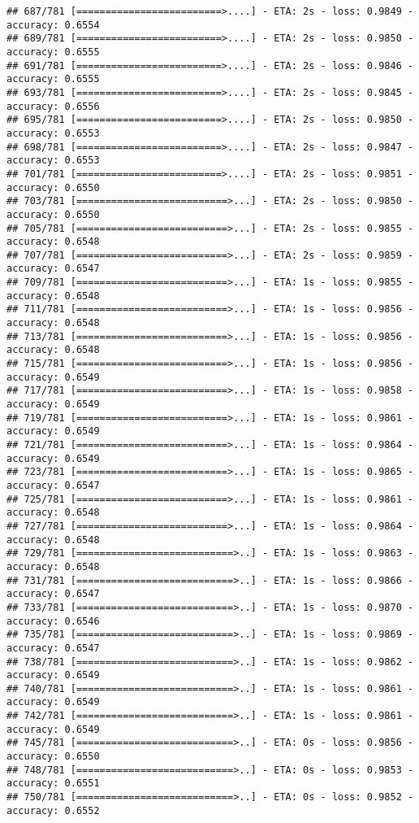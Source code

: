 \documentclass[
]{article}
\begin{document}
\begin{verbatim}
## 687/781 [=========================>....] - ETA: 2s - loss: 0.9849 - accuracy: 0.6554
## 689/781 [=========================>....] - ETA: 2s - loss: 0.9850 - accuracy: 0.6555
## 691/781 [=========================>....] - ETA: 2s - loss: 0.9846 - accuracy: 0.6555
## 693/781 [=========================>....] - ETA: 2s - loss: 0.9845 - accuracy: 0.6556
## 695/781 [=========================>....] - ETA: 2s - loss: 0.9850 - accuracy: 0.6553
## 698/781 [=========================>....] - ETA: 2s - loss: 0.9847 - accuracy: 0.6553
## 701/781 [=========================>....] - ETA: 2s - loss: 0.9851 - accuracy: 0.6550
## 703/781 [==========================>...] - ETA: 2s - loss: 0.9850 - accuracy: 0.6550
## 705/781 [==========================>...] - ETA: 2s - loss: 0.9855 - accuracy: 0.6548
## 707/781 [==========================>...] - ETA: 2s - loss: 0.9859 - accuracy: 0.6547
## 709/781 [==========================>...] - ETA: 1s - loss: 0.9855 - accuracy: 0.6548
## 711/781 [==========================>...] - ETA: 1s - loss: 0.9856 - accuracy: 0.6548
## 713/781 [==========================>...] - ETA: 1s - loss: 0.9856 - accuracy: 0.6548
## 715/781 [==========================>...] - ETA: 1s - loss: 0.9856 - accuracy: 0.6549
## 717/781 [==========================>...] - ETA: 1s - loss: 0.9858 - accuracy: 0.6549
## 719/781 [==========================>...] - ETA: 1s - loss: 0.9861 - accuracy: 0.6549
## 721/781 [==========================>...] - ETA: 1s - loss: 0.9864 - accuracy: 0.6549
## 723/781 [==========================>...] - ETA: 1s - loss: 0.9865 - accuracy: 0.6547
## 725/781 [==========================>...] - ETA: 1s - loss: 0.9861 - accuracy: 0.6548
## 727/781 [==========================>...] - ETA: 1s - loss: 0.9864 - accuracy: 0.6548
## 729/781 [===========================>..] - ETA: 1s - loss: 0.9863 - accuracy: 0.6548
## 731/781 [===========================>..] - ETA: 1s - loss: 0.9866 - accuracy: 0.6547
## 733/781 [===========================>..] - ETA: 1s - loss: 0.9870 - accuracy: 0.6546
## 735/781 [===========================>..] - ETA: 1s - loss: 0.9869 - accuracy: 0.6547
## 738/781 [===========================>..] - ETA: 1s - loss: 0.9862 - accuracy: 0.6549
## 740/781 [===========================>..] - ETA: 1s - loss: 0.9861 - accuracy: 0.6549
## 742/781 [===========================>..] - ETA: 1s - loss: 0.9861 - accuracy: 0.6549
## 745/781 [===========================>..] - ETA: 0s - loss: 0.9856 - accuracy: 0.6550
## 748/781 [===========================>..] - ETA: 0s - loss: 0.9853 - accuracy: 0.6551
## 750/781 [===========================>..] - ETA: 0s - loss: 0.9852 - accuracy: 0.6552

\end{verbatim}
\end{document}
